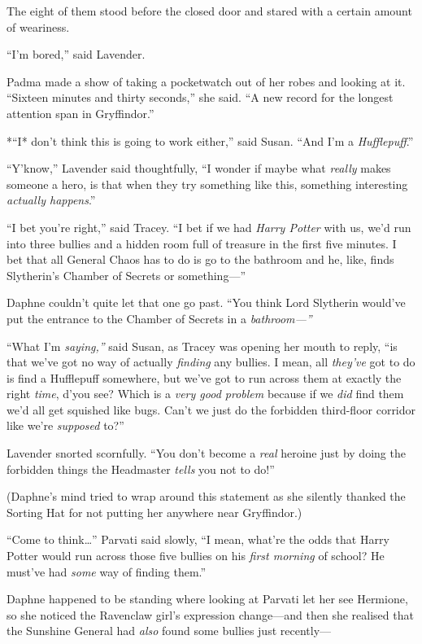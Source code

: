 The eight of them stood before the closed door and stared with a certain
amount of weariness.

``I'm bored,'' said Lavender.

Padma made a show of taking a pocketwatch out of her robes and looking
at it. ``Sixteen minutes and thirty seconds,'' she said. ``A new record
for the longest attention span in Gryffindor.''

*``I* don't think this is going to work either,'' said Susan. ``And I'm
a \emph{Hufflepuff}.''

``Y'know,'' Lavender said thoughtfully, ``I wonder if maybe what
\emph{really} makes someone a hero, is that when they try something like
this, something interesting \emph{actually happens}.''

``I bet you're right,'' said Tracey. ``I bet if we had \emph{Harry
Potter} with us, we'd run into three bullies and a hidden room full of
treasure in the first five minutes. I bet that all General Chaos has to
do is go to the bathroom and he, like, finds Slytherin's Chamber of
Secrets or something---''

Daphne couldn't quite let that one go past. ``You think Lord Slytherin
would've put the entrance to the Chamber of Secrets in a
\emph{bathroom---''}

``What I'm \emph{saying,''} said Susan, as Tracey was opening her mouth
to reply, ``is that we've got no way of actually \emph{finding} any
bullies. I mean, all \emph{they've} got to do is find a Hufflepuff
somewhere, but we've got to run across them at exactly the right
\emph{time}, d'you see? Which is a \emph{very good problem} because if
we \emph{did} find them we'd all get squished like bugs. Can't we just
do the forbidden third-floor corridor like we're \emph{supposed} to?''

Lavender snorted scornfully. ``You don't become a \emph{real} heroine
just by doing the forbidden things the Headmaster \emph{tells} you not
to do!''

(Daphne's mind tried to wrap around this statement as she silently
thanked the Sorting Hat for not putting her anywhere near Gryffindor.)

``Come to think\ldots{}'' Parvati said slowly, ``I mean, what're the
odds that Harry Potter would run across those five bullies on his
\emph{first morning} of school? He must've had \emph{some} way of
finding them.''

Daphne happened to be standing where looking at Parvati let her see
Hermione, so she noticed the Ravenclaw girl's expression change---and
then she realised that the Sunshine General had \emph{also} found some
bullies just recently---

